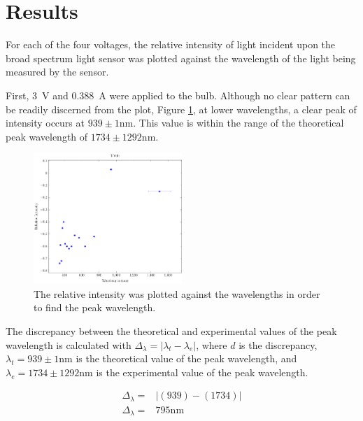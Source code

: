 \documentclass[a4paper]{article}
\begin{document}
\section{Results}

\qq For each of the four voltages, the relative intensity of light incident upon
the broad spectrum light sensor was plotted against the wavelength of the light
being measured by the sensor.

\qq First, \SI{3}{\volt} and \SI{0.388}{\ampere} were applied to the
bulb. Although no clear pattern can be readily discerned from the plot, Figure
\ref{gph:3volt}, at lower wavelengths, a clear peak of intensity occurs at
\( 939 \pm 1 \si{\nano\meter} \). This value is within the range of the
theoretical peak wavelength of \( 1734 \pm 1292 \si{\nano\meter} \). 

\begin{figure}[H]
  \begin{center}
    \includegraphics[width=0.5\textwidth]{P6-BlackbodyRadiation/Plots/3Volt/3volt.pdf}
  \end{center}
  \label{gph:3volt}
  \caption{The relative intensity was plotted against the wavelengths in order
    to find the peak wavelength.}
\end{figure}

\qq The discrepancy between the theoretical and experimental values of the peak
wavelength is calculated with
\( \Delta_{\lambda} = | \lambda_t - \lambda_e | \), where \( d \) is the
discrepancy, \( \lambda_t = 939 \pm 1 \si{\nano\meter} \) is the theoretical
value of the peak wavelength, and
\( \lambda_e = 1734 \pm 1292 \si{\nano\meter} \) is the experimental value of
the peak wavelength.

\begin{align*}
  \Delta_{\lambda} =& \left| (939) - (1734) \right| \\
  \Delta_{\lambda} =& 795 \si{\nano\meter} \\
\end{align*}
\end{document}

